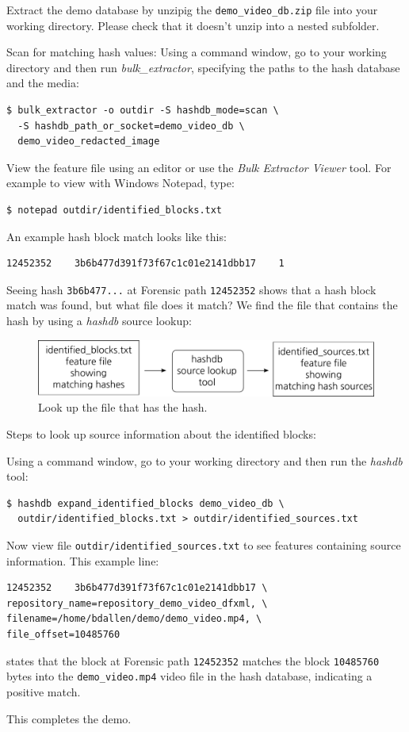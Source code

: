 \documentclass[12pt,twoside]{article}
\newcommand{\hdb}{\emph{hashdb}\xspace}
\newcommand{\bulk}{\emph{bulk\_extractor}\xspace}
\newcommand{\bev}{\emph{Bulk Extractor Viewer}\xspace}
\begin{document}
\begin{compactenum}
\item Extract the demo database
by unzipig the \texttt{demo\_video\_db.zip} file
into your working directory.
Please check that it doesn't unzip into a nested subfolder.
\item Scan for matching hash values: Using a command window, go to your working directory and then run \bulk,
specifying the paths to the hash database and the media:
\begin{verbatim}
$ bulk_extractor -o outdir -S hashdb_mode=scan \
  -S hashdb_path_or_socket=demo_video_db \
  demo_video_redacted_image
\end{verbatim}
\item View the feature file using an editor or use the \bev tool.
For example to view with Windows Notepad, type:
\begin{verbatim}
$ notepad outdir/identified_blocks.txt
\end{verbatim}
An example hash block match looks like this:
\begin{verbatim}
12452352    3b6b477d391f73f67c1c01e2141dbb17    1
\end{verbatim}
\end{compactenum}

Seeing hash \texttt{3b6b477...} at Forensic path \texttt{12452352}
shows that a hash block match was found, but what file does it match?
We find the file that contains the hash by using a \hdb source lookup:
\begin{figure}[H]
  \center
  \includegraphics[scale=0.6]{drawings/source_lookup}
  \caption*{Look up the file that has the hash.}
  \label{fig:source_lookup}
\end{figure}

Steps to look up source information about the identified blocks:
\begin{compactenum}
\item Using a command window, go to your working directory and then run
the \hdb tool:
\begin{verbatim}
$ hashdb expand_identified_blocks demo_video_db \
  outdir/identified_blocks.txt > outdir/identified_sources.txt
\end{verbatim}

\item Now view file \texttt{outdir/identified\_sources.txt} to see
features containing source information.
This example line:
\begin{verbatim}
12452352    3b6b477d391f73f67c1c01e2141dbb17 \
repository_name=repository_demo_video_dfxml, \
filename=/home/bdallen/demo/demo_video.mp4, \
file_offset=10485760
\end{verbatim}

states that the block at Forensic path \texttt{12452352}
matches the block \texttt{10485760} bytes into the
\texttt{demo\_video.mp4} video file
in the hash database,
indicating a positive match.
\end{compactenum}

This completes the demo.
\end{document}
